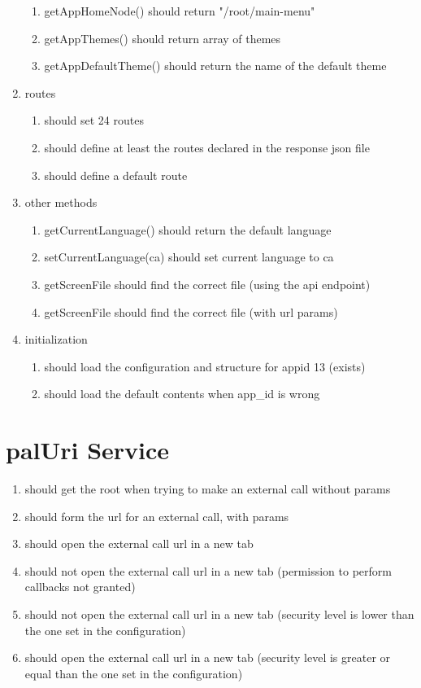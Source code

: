 \begin{singlespace}
\begin{enumerate}
\begin{enumerate}
\item         getAppHomeNode() should return "/root/main-menu"
\item         getAppThemes() should return array of themes
\item         getAppDefaultTheme() should return the name of the default theme
\end{enumerate}
\item     routes
\begin{enumerate}
\item         should set 24 routes
\item         should define at least the routes declared in the response json file
\item         should define a default route
\end{enumerate}
\item     other methods
\begin{enumerate}
\item         getCurrentLanguage() should return the default language
\item         setCurrentLanguage(ca) should set current language to ca
\item         getScreenFile should find the correct file (using the api endpoint)
\item         getScreenFile should find the correct file (with url params)
\end{enumerate}
\item     initialization
\begin{enumerate}
\item         should load the configuration and structure for appid 13 (exists)
\item         should load the default contents when app\_id is wrong
\end{enumerate}
\end{enumerate}

\section*{palUri Service}
\begin{enumerate}
\item     should get the root when trying to make an external call without params
\item     should form the url for an external call, with params
\item     should open the external call url in a new tab
\item     should not open the external call url in a new tab (permission to perform callbacks not granted)
\item     should not open the external call url in a new tab (security level is lower than the one set in the configuration)
\item     should open the external call url in a new tab (security level is greater or equal than the one set in the configuration)
\end{enumerate}

\end{singlespace}